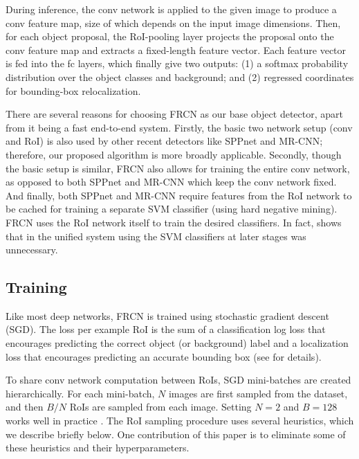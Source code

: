 \documentclass[10pt,twocolumn,letterpaper]{article}
\begin{document}
During inference, the conv network is applied to the given image to produce a conv feature map, size of which depends on the input image dimensions. Then, for each object proposal, the RoI-pooling layer projects the proposal onto the conv feature map and extracts a fixed-length feature vector. Each feature vector is fed into the fc layers, which finally give two outputs: (1) a softmax probability distribution over the object classes and background; and (2) regressed coordinates for bounding-box relocalization.

There are several reasons for choosing FRCN as our base object detector, apart from it being a fast end-to-end system. Firstly, the basic two network setup (conv and RoI) is also used by other recent detectors like SPPnet and MR-CNN; therefore, our proposed algorithm is more broadly applicable. Secondly, though the basic setup is similar, FRCN also allows for training the entire conv network, as opposed to both SPPnet and MR-CNN which keep the conv network fixed. And finally, both SPPnet and MR-CNN require features from the RoI network to be cached for training a separate SVM classifier (using hard negative mining). FRCN uses the RoI network itself to train the desired classifiers. In fact, \cite{frcn} shows that in the unified system using the SVM classifiers at later stages was unnecessary.





\subsection{Training}\label{sec:mini}
Like most deep networks, FRCN is trained using stochastic gradient descent (SGD). The loss per example RoI is the sum of a classification log loss that encourages predicting the correct object (or background) label and a localization loss that encourages predicting an accurate bounding box (see \cite{frcn} for details).

To share conv network computation between RoIs, SGD mini-batches are created hierarchically. For each mini-batch, $N$ images are first sampled from the dataset, and then $B/N$ RoIs are sampled from each image. Setting $N=2$ and $B=128$ works well in practice \cite{frcn}. The RoI sampling procedure uses several heuristics, which we describe briefly below.
One contribution of this paper is to eliminate some of these heuristics and their hyperparameters.

\vspace{-0.1in}
\end{document}

